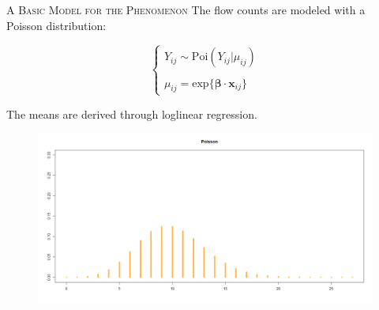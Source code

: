 \documentclass{beamer}
\begin{document}
\begin{frame}{\textsc{A Basic Model for the Phenomenon}}
	The flow counts are modeled with a \alert{Poisson} distribution:
	
	\begin{equation}
	\begin{cases}
	
	Y_{ij} \sim \mathrm{Poi}(Y_{ij}|\mu_{ij}) \\
	\\
	
	\mu_{ij} = \mathrm{exp}\{\boldsymbol{\beta}\cdot \mathbf{x}_{ij}\}
	
	\end{cases}
	\end{equation}
	
	The means are derived through \alert{loglinear} regression.
	\begin{figure}[H]
		\centering
		\includegraphics[width=0.75\linewidth]{pictures/mod1.png} 
		\label{fig1}
	\end{figure}
	
\end{frame}
\end{document}

